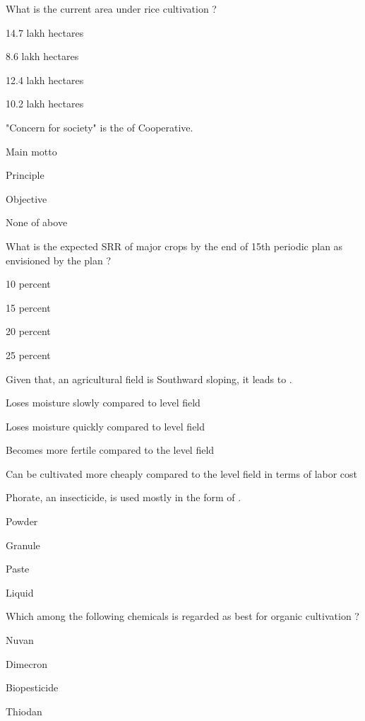 \begin{questions}
\question What is the current area under rice cultivation ?
\begin{items}
\item* 14.7 lakh hectares
\item 8.6 lakh hectares
\item 12.4 lakh hectares
\item 10.2 lakh hectares
\end{items}

\question "Concern for society" is the \fillin[][3cm] of Cooperative.
\begin{items}
\item Main motto
\item* Principle
\item Objective
\item None of above
\end{items}

\question What is the expected SRR of major crops by the end of 15th periodic plan as envisioned by the plan ?
\begin{items}
\item 10 percent
\item 15 percent
\item 20 percent
\item* 25 percent
\end{items}

\question Given that, an agricultural field is Southward sloping, it leads to \fillin[][3cm].
\begin{items}
\item Loses moisture slowly compared to level field
\item* Loses moisture quickly compared to level field
\item Becomes more fertile compared to the level field
\item Can be cultivated more cheaply compared to the level field in terms of labor cost
\end{items}

\question Phorate, an insecticide, is used mostly in the form of \fillin[][3cm].
\begin{items}
\item Powder
\item* Granule
\item Paste
\item Liquid
\end{items}

\question Which among the following chemicals is regarded as best for organic cultivation ?
\begin{items}
\item Nuvan
\item Dimecron
\item* Biopesticide
\item Thiodan
\end{items}


\end{questions}
